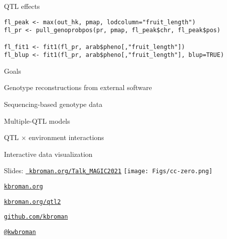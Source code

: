 \documentclass[12pt,t,aspectratio=169]{beamer}
\begin{document}
\begin{frame}[c,fragile]{QTL effects}

\begin{center} \begin{minipage}[c]{11.3cm} \begin{semiverbatim}
\begin{lstlisting}[linewidth=11.3cm]
fl_peak <- max(out_hk, pmap, lodcolumn="fruit_length")
fl_pr <- pull_genoprobpos(pr, pmap, fl_peak$chr, fl_peak$pos)

fl_fit1 <- fit1(fl_pr, arab$pheno[,"fruit_length"])
fl_blup <- fit1(fl_pr, arab$pheno[,"fruit_length"], blup=TRUE)
\end{lstlisting}
\end{semiverbatim} \end{minipage} \end{center}

\end{frame}









\begin{frame}{Goals}

  \bbi
\item Genotype reconstructions from external software

\item Sequencing-based genotype data

\item Multiple-QTL models

\item QTL $\times$ environment interactions

\item Interactive data visualization
  \ei

\end{frame}




\begin{frame}[c]{}

\Large

Slides: \href{https://kbroman.org/Talk_MAGIC2021}{\tt
  kbroman.org/Talk\_MAGIC2021} \quad
\texttt{[image: Figs/cc-zero.png]}

\vspace{7mm}

\href{https://kbroman.org}{\tt \lolit kbroman.org}

\vspace{7mm}

\href{https://kbroman.org/qtl2}{\tt kbroman.org/qtl2}

\vspace{7mm}

\href{https://github.com/kbroman}{\tt \lolit github.com/kbroman}

\vspace{7mm}

\href{https://twitter.com/kwbroman}{\tt \lolit @kwbroman}


\end{frame}
\end{document}
